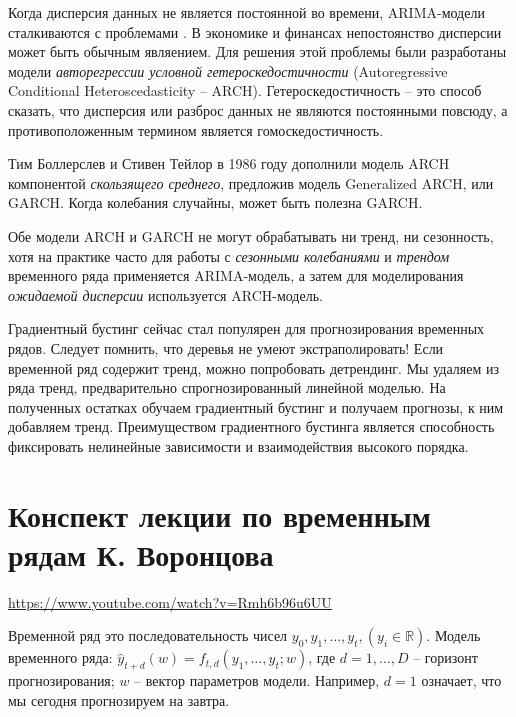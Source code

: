 \documentclass[%
	11pt,
	a4paper,
	utf8,
		]{article}
\begin{document}
Когда дисперсия данных не является постоянной во времени, ARIMA-модели сталкиваются с проблемами \cite[]{gruzdev:time-series-2022}. В экономике и финансах непостоянство дисперсии может быть обычным являением. Для решения этой проблемы были разработаны модели \emph{авторегрессии условной гетероскедостичности} (Autoregressive Conditional Heteroscedasticity -- ARCH). Гетероскедостичность -- это способ сказать, что дисперсия или разброс данных не являются постоянными повсюду, а противоположенным термином является гомоскедостичность.

Тим Боллерслев и Стивен Тейлор в 1986 году дополнили модель ARCH компонентой \emph{скользящего среднего}, предложив модель Generalized ARCH, или GARCH. Когда колебания случайны, может быть полезна GARCH.

{\color{red}Обе модели ARCH и GARCH не могут обрабатывать ни тренд, ни сезонность}, хотя на практике часто для работы с \emph{сезонными колебаниями} и \emph{трендом} временного ряда применяется ARIMA-модель, а затем для моделирования \emph{ожидаемой дисперсии} используется ARCH-модель.

Градиентный бустинг сейчас стал популярен для прогнозирования временных рядов. Следует помнить, что {\color{red}деревья не умеют экстраполировать!} Если временной ряд содержит тренд, можно попробовать детрендинг. Мы удаляем из ряда тренд, предварительно спрогнозированный линейной моделью. На полученных остатках обучаем градиентный бустинг и получаем прогнозы, к ним добавляем тренд. Преимуществом градиентного бустинга является способность фиксировать нелинейные зависимости и взаимодействия высокого порядка.

\section{Конспект лекции по временным рядам К. Воронцова}

\url{https://www.youtube.com/watch?v=Rmh6b96u6UU}

Временной ряд это последовательность чисел $ y_0, y_1, \ldots, y_t, (y_i \in \mathbb{R}) $. Модель временного ряда: $ \hat{y}_{t + d}(w) = f_{t, d}(y_1, \ldots, y_t; w) $, где $ d = 1, \ldots, D $ -- горизонт прогнозирования; $ w $ -- вектор параметров модели. Например, $ d = 1 $ означает, что мы сегодня прогнозируем на завтра.
\end{document}
